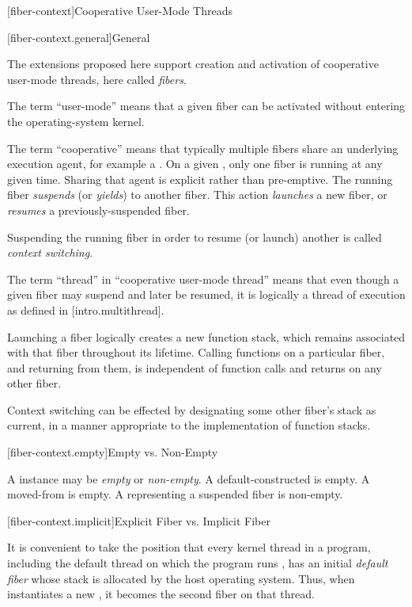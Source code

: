 \newpage

\setcounter{section}{33}
\setcounter{subsection}{6}

\label{api}

[fiber-context]{Cooperative User-Mode Threads}

[fiber-context.general]{General}

The extensions proposed here support creation and activation of cooperative
user-mode threads, here called \emph{fibers}.

The term ``user-mode'' means that a given fiber can be activated without
entering the operating-system kernel.

The term ``cooperative'' means that typically multiple fibers share an
underlying execution agent, for example a . On a
given , only one fiber is running at any given time. Sharing
that agent is explicit rather than pre-emptive. The running
fiber \emph{suspends} (or \emph{yields}) to another fiber. This
action \emph{launches} a new fiber, or \emph{resumes} a previously-suspended
fiber.

Suspending the running fiber in order to resume (or launch) another is
called \emph{context switching}.

The term ``thread'' in ``cooperative user-mode thread'' means that even
though a given fiber may suspend and later be resumed, it is logically a
thread of execution as defined in [intro.multithread].

Launching a fiber logically creates a new function stack, which remains
associated with that fiber throughout its lifetime. Calling functions on a
particular fiber, and returning from them, is independent of function calls
and returns on any other fiber.

Context switching can be effected by designating some other fiber's stack as
current, in a manner appropriate to the implementation of function stacks.

[fiber-context.empty]{Empty vs. Non-Empty}

A \fiber instance may be \emph{empty} or \emph{non-empty}. A
default-constructed \fiber is empty. A moved-from \fiber is empty. A \fiber
representing a suspended fiber is non-empty.

[fiber-context.implicit]{Explicit Fiber vs. Implicit Fiber}

It is convenient to take the position that every kernel thread in a program,
including the default thread on which the program runs \main, has an initial
\emph{default fiber} whose stack is allocated by the host operating system. Thus,
when \main instantiates a new \fiber, it becomes the second fiber on
that thread.

